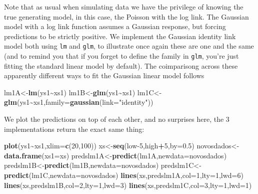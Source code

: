 \documentclass[
]{book}
\newenvironment{Shaded}{\begin{snugshade}}{\end{snugshade}}
\newcommand{\AttributeTok}[1]{\textcolor[rgb]{0.13,0.29,0.53}{#1}}
\newcommand{\DecValTok}[1]{\textcolor[rgb]{0.00,0.00,0.81}{#1}}
\newcommand{\FloatTok}[1]{\textcolor[rgb]{0.00,0.00,0.81}{#1}}
\newcommand{\FunctionTok}[1]{\textcolor[rgb]{0.13,0.29,0.53}{\textbf{#1}}}
\newcommand{\NormalTok}[1]{#1}
\newcommand{\OtherTok}[1]{\textcolor[rgb]{0.56,0.35,0.01}{#1}}
\newcommand{\SpecialCharTok}[1]{\textcolor[rgb]{0.81,0.36,0.00}{\textbf{#1}}}
\newcommand{\StringTok}[1]{\textcolor[rgb]{0.31,0.60,0.02}{#1}}
\begin{document}
Note that as usual when simulating data we have the privilege of knowing the true generating model, in this case, the Poisson with the log link. The Gaussian model with a log link function assumes a Gaussian response, but forcing predictions to be strictly positive. We implement the Gaussian identity link model both using \texttt{lm} and \texttt{glm}, to illustrate once again these are one and the same (and to remind you that if you forget to define the family in \texttt{glm}, you're just fitting the standard linear model by default). The coimparisong across these apparently different ways to fit the Gaussian linear model follows

\begin{Shaded}
\begin{Highlighting}[]
\NormalTok{lm1A}\OtherTok{\textless{}{-}}\FunctionTok{lm}\NormalTok{(ys1}\SpecialCharTok{\textasciitilde{}}\NormalTok{xs1)}
\NormalTok{lm1B}\OtherTok{\textless{}{-}}\FunctionTok{glm}\NormalTok{(ys1}\SpecialCharTok{\textasciitilde{}}\NormalTok{xs1) }
\NormalTok{lm1C}\OtherTok{\textless{}{-}}\FunctionTok{glm}\NormalTok{(ys1}\SpecialCharTok{\textasciitilde{}}\NormalTok{xs1,}\AttributeTok{family=}\FunctionTok{gaussian}\NormalTok{(}\AttributeTok{link=}\StringTok{"identity"}\NormalTok{))}
\end{Highlighting}
\end{Shaded}

We plot the predictions on top of each other, and no surprises here, the 3 implementations return the exact same thing:

\begin{Shaded}
\begin{Highlighting}[]
\FunctionTok{plot}\NormalTok{(ys1}\SpecialCharTok{\textasciitilde{}}\NormalTok{xs1,}\AttributeTok{xlim=}\FunctionTok{c}\NormalTok{(}\DecValTok{20}\NormalTok{,}\DecValTok{100}\NormalTok{))}
\NormalTok{xs}\OtherTok{\textless{}{-}}\FunctionTok{seq}\NormalTok{(low}\DecValTok{{-}5}\NormalTok{,high}\SpecialCharTok{+}\DecValTok{5}\NormalTok{,}\AttributeTok{by=}\FloatTok{0.5}\NormalTok{)}
\NormalTok{novosdados}\OtherTok{\textless{}{-}}\FunctionTok{data.frame}\NormalTok{(}\AttributeTok{xs1=}\NormalTok{xs)}
\NormalTok{predslm1A}\OtherTok{\textless{}{-}}\FunctionTok{predict}\NormalTok{(lm1A,}\AttributeTok{newdata=}\NormalTok{novosdados)}
\NormalTok{predslm1B}\OtherTok{\textless{}{-}}\FunctionTok{predict}\NormalTok{(lm1B,}\AttributeTok{newdata=}\NormalTok{novosdados)}
\NormalTok{predslm1C}\OtherTok{\textless{}{-}}\FunctionTok{predict}\NormalTok{(lm1C,}\AttributeTok{newdata=}\NormalTok{novosdados)}
\FunctionTok{lines}\NormalTok{(xs,predslm1A,}\AttributeTok{col=}\DecValTok{1}\NormalTok{,}\AttributeTok{lty=}\DecValTok{1}\NormalTok{,}\AttributeTok{lwd=}\DecValTok{6}\NormalTok{)}
\FunctionTok{lines}\NormalTok{(xs,predslm1B,}\AttributeTok{col=}\DecValTok{2}\NormalTok{,}\AttributeTok{lty=}\DecValTok{1}\NormalTok{,}\AttributeTok{lwd=}\DecValTok{3}\NormalTok{)}
\FunctionTok{lines}\NormalTok{(xs,predslm1C,}\AttributeTok{col=}\DecValTok{3}\NormalTok{,}\AttributeTok{lty=}\DecValTok{1}\NormalTok{,}\AttributeTok{lwd=}\DecValTok{1}\NormalTok{)}
\end{Highlighting}
\end{Shaded}
\end{document}
